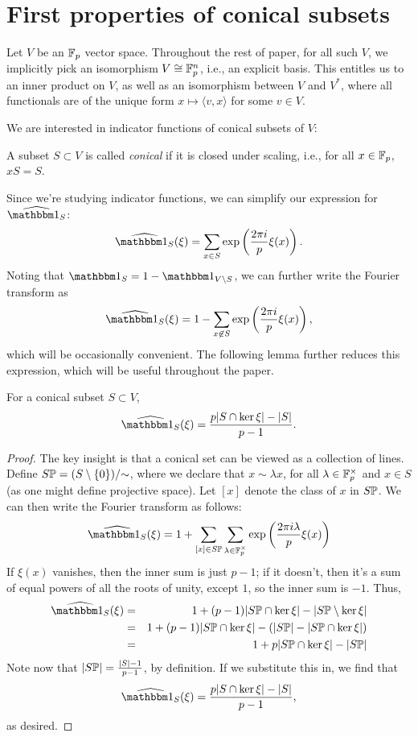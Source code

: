 \section{First properties of conical subsets}\label{sec:part0}

Let $V$ be an $\F_p$ vector space.
Throughout the rest of paper, for all such $V$, we implicitly pick an isomorphism 
	$V\cong\F_p^n$, i.e., an explicit basis. This
	entitles us to an inner product on $V$, as well as an isomorphism between $V$ and
	$V^*$, where all functionals are of the unique form $x \mapsto \langle v, x \rangle$
	for some $v\in V$.

We are interested in indicator functions of conical subsets of $V$:
\begin{defn}
    A subset $S\subset V$ is called \emph{conical} if it is closed under scaling,
    i.e., for all $x\in \F_p$, $xS = S$.    
\end{defn}
Since we're studying indicator functions, we can simplify our expression for 
$\widehat{\IND_S}$:
\[ \widehat{\IND_S}(\xi) = \sum_{x\in S} \exp \left(\frac{2\pi i}{p} \xi(x)\right). \]
Noting that $\IND_S = 1 - \IND_{V\setminus S}$, we can further write the Fourier transform as
\[ \widehat{\IND_S}(\xi) = 1 - \sum_{x\not\in S} \exp \left(\frac{2\pi i}{p} \xi(x)\right), \]
which will be occasionally convenient. The following lemma further reduces this expression,
which will be useful throughout the paper.
\begin{lem}\label{lem:FT-conical-subset}
	For a conical subset $S \subset V$,
	\[ \widehat{\IND_S}(\xi) = \frac{p|S \cap \ker \xi| - |S|}{p-1}. \]
	\begin{proof}
	   The key insight is that a conical set can be viewed as a collection of lines.
	   Define $S\P = (S\setminus\{0\}) / {\sim}$, where we declare that 
	   $x \sim \lambda x$, for all $\lambda\in\F_p^\times$ and
	   $x\in S$ (as one might define projective space). Let $[x]$ denote the class
	   of $x$ in $S\P$. We can then write the Fourier transform as follows:
	   \[ \widehat{\IND_S}(\xi) = 
	           1 + \sum_{[x]\in S\P} 
	               \sum_{\lambda\in\F_p^\times} \exp \left(\frac{2\pi i \lambda}{p} \xi(x)\right) \]
	   If $\xi(x)$ vanishes, then the inner sum is just $p-1$; if it doesn't, then it's
	   a sum of equal powers of all the roots of unity, except $1$, so the inner sum is $-1$.
	   Thus,
	   \begin{eqnarray*}
	       \widehat{\IND_S}(\xi)
	       &=& 1 + 
	           (p-1)|S\P \cap \ker \xi| - 
	           |S\P \setminus \ker\xi| \\
	       &=& 1 + 
	           (p-1)|S\P \cap \ker \xi| - 
	           (|S\P| - |S\P \cap \ker\xi|) \\
	       &=& 1 + 
	           p|S\P \cap \ker \xi| - |S\P|
	   \end{eqnarray*}
	   Note now that $|S\P| = \frac{|S| - 1}{p-1}$, by definition. If we substitute
	   this in, we find that 
	   \[ \widehat{\IND_S}(\xi) = \frac{p|S \cap \ker \xi| - |S|}{p-1}, \]
	   as desired.
	\end{proof}
\end{lem}

